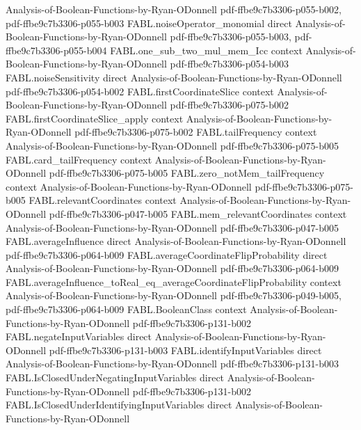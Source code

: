 \begin{theorem}
  {Analysis-of-Boolean-Functions-by-Ryan-ODonnell}
  {pdf-ffbe9c7b3306-p055-b002,
    pdf-ffbe9c7b3306-p055-b003}
\proofstep
  {FABL.noiseOperator_monomial}
  {direct}
  {Analysis-of-Boolean-Functions-by-Ryan-ODonnell}
  {pdf-ffbe9c7b3306-p055-b003,
    pdf-ffbe9c7b3306-p055-b004}
\proofstep
  {FABL.one_sub_two_mul_mem_Icc}
  {context}
  {Analysis-of-Boolean-Functions-by-Ryan-ODonnell}
  {pdf-ffbe9c7b3306-p054-b003}
\proofstep
  {FABL.noiseSensitivity}
  {direct}
  {Analysis-of-Boolean-Functions-by-Ryan-ODonnell}
  {pdf-ffbe9c7b3306-p054-b002}
\proofstep
  {FABL.firstCoordinateSlice}
  {context}
  {Analysis-of-Boolean-Functions-by-Ryan-ODonnell}
  {pdf-ffbe9c7b3306-p075-b002}
\proofstep
  {FABL.firstCoordinateSlice_apply}
  {context}
  {Analysis-of-Boolean-Functions-by-Ryan-ODonnell}
  {pdf-ffbe9c7b3306-p075-b002}
\proofstep
  {FABL.tailFrequency}
  {context}
  {Analysis-of-Boolean-Functions-by-Ryan-ODonnell}
  {pdf-ffbe9c7b3306-p075-b005}
\proofstep
  {FABL.card_tailFrequency}
  {context}
  {Analysis-of-Boolean-Functions-by-Ryan-ODonnell}
  {pdf-ffbe9c7b3306-p075-b005}
\proofstep
  {FABL.zero_notMem_tailFrequency}
  {context}
  {Analysis-of-Boolean-Functions-by-Ryan-ODonnell}
  {pdf-ffbe9c7b3306-p075-b005}
\proofstep
  {FABL.relevantCoordinates}
  {context}
  {Analysis-of-Boolean-Functions-by-Ryan-ODonnell}
  {pdf-ffbe9c7b3306-p047-b005}
\proofstep
  {FABL.mem_relevantCoordinates}
  {context}
  {Analysis-of-Boolean-Functions-by-Ryan-ODonnell}
  {pdf-ffbe9c7b3306-p047-b005}
\proofstep
  {FABL.averageInfluence}
  {direct}
  {Analysis-of-Boolean-Functions-by-Ryan-ODonnell}
  {pdf-ffbe9c7b3306-p064-b009}
\proofstep
  {FABL.averageCoordinateFlipProbability}
  {direct}
  {Analysis-of-Boolean-Functions-by-Ryan-ODonnell}
  {pdf-ffbe9c7b3306-p064-b009}
\proofstep
  {FABL.averageInfluence_toReal_eq_averageCoordinateFlipProbability}
  {context}
  {Analysis-of-Boolean-Functions-by-Ryan-ODonnell}
  {pdf-ffbe9c7b3306-p049-b005,
    pdf-ffbe9c7b3306-p064-b009}
\proofstep
  {FABL.BooleanClass}
  {context}
  {Analysis-of-Boolean-Functions-by-Ryan-ODonnell}
  {pdf-ffbe9c7b3306-p131-b002}
\proofstep
  {FABL.negateInputVariables}
  {direct}
  {Analysis-of-Boolean-Functions-by-Ryan-ODonnell}
  {pdf-ffbe9c7b3306-p131-b003}
\proofstep
  {FABL.identifyInputVariables}
  {direct}
  {Analysis-of-Boolean-Functions-by-Ryan-ODonnell}
  {pdf-ffbe9c7b3306-p131-b003}
\proofstep
  {FABL.IsClosedUnderNegatingInputVariables}
  {direct}
  {Analysis-of-Boolean-Functions-by-Ryan-ODonnell}
  {pdf-ffbe9c7b3306-p131-b002}
\proofstep
  {FABL.IsClosedUnderIdentifyingInputVariables}
  {direct}
  {Analysis-of-Boolean-Functions-by-Ryan-ODonnell}

\end{theorem}
